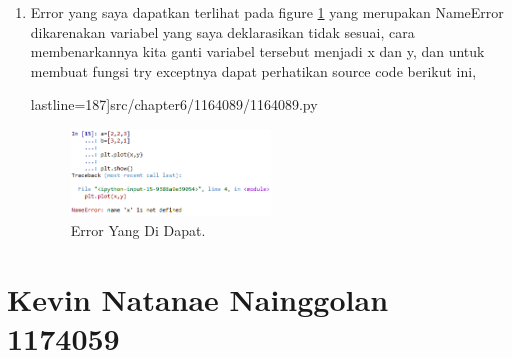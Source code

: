 \begin{enumerate}

\item Error yang saya dapatkan terlihat pada figure \ref{YNC6-15} yang merupakan NameError dikarenakan variabel yang saya deklarasikan tidak sesuai, cara membenarkannya kita ganti variabel tersebut menjadi x dan y, dan untuk membuat fungsi try exceptnya dapat perhatikan source code berikut ini,

	 lastline=187]{src/chapter6/1164089/1164089.py}

	\begin{figure}[!htbp!]
		\centerline{\includegraphics[width=0.5\textwidth]{figures/chapter6/1164089/YNC6-15.png}}
		\caption{Error Yang Di Dapat.}
		\label{YNC6-15}
	\end{figure}

\end{enumerate}

\section {Kevin Natanae Nainggolan 1174059}

